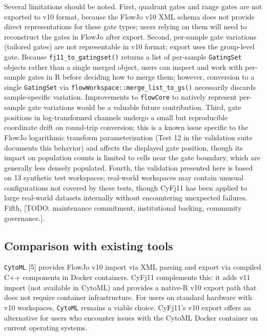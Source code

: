 \documentclass[
]{article}
\begin{document}
Several limitations should be noted. First, quadrant gates and range
gates are not exported to v10 format, because the FlowJo v10 XML schema
does not provide direct representations for these gate types; users
relying on them will need to reconstruct the gates in FlowJo after
export. Second, per-sample gate variations (tailored gates) are not
representable in v10 format; export uses the group-level gate. Because
\texttt{fj11\_to\_gatingset()} returns a list of per-sample
\texttt{GatingSet} objects rather than a single merged object, users can
inspect and work with per-sample gates in R before deciding how to merge
them; however, conversion to a single \texttt{GatingSet} via
\texttt{flowWorkspace::merge\_list\_to\_gs()} necessarily discards
sample-specific variation. Improvements to \texttt{flowCore} to natively
represent per-sample gate variations would be a valuable future
contribution. Third, gate positions in log-transformed channels undergo
a small but reproducible coordinate drift on round-trip conversion; this
is a known issue specific to the FlowJo logarithmic transform
parameterization (Test 12 in the validation suite documents this
behavior) and affects the displayed gate position, though its impact on
population counts is limited to cells near the gate boundary, which are
generally less densely populated. Fourth, the validation presented here
is based on 13 synthetic test workspaces; real-world workspaces may
contain unusual configurations not covered by these tests, though CyFj11
has been applied to large real-world datasets internally without
encountering unexpected failures. Fifth,
\textcolor{pending}{[TODO: maintenance commitment, institutional backing, community governance.]}.

\subsection{Comparison with existing
tools}\label{comparison-with-existing-tools}

\texttt{CytoML} {[}5{]} provides FlowJo v10 import via XML parsing and
export via compiled C++ components in Docker containers. CyFj11
complements this: it adds v11 import (not available in CytoML) and
provides a native-R v10 export path that does not require container
infrastructure. For users on standard hardware with v10 workspaces,
\texttt{CytoML} remains a viable choice. CyFj11's v10 export offers an
alternative for users who encounter issues with the CytoML Docker
container on current operating systems.
\end{document}
